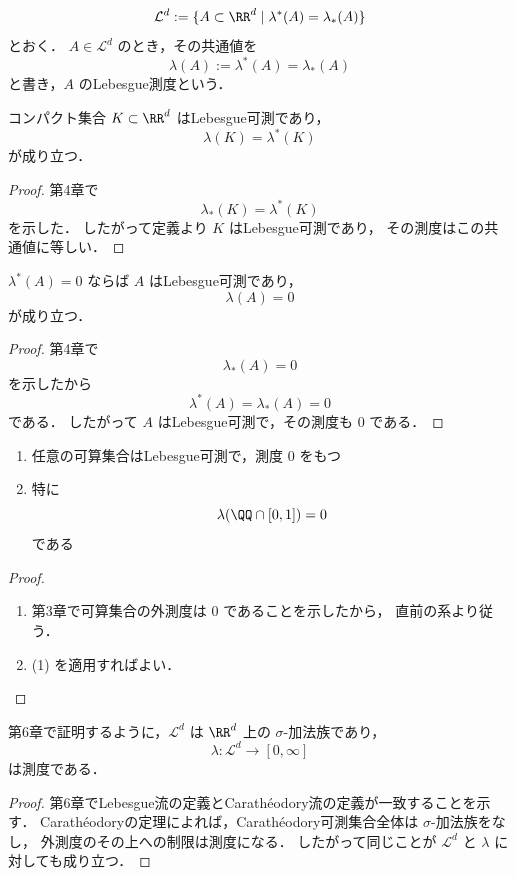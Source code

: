 \begin{definition}[Lebesgue可測集合とLebesgue測度]
\[
\mathcal L^d
:=
\{A \subset \RR^d \mid \lambda^*(A)=\lambda_*(A)\}
\]
とおく．
$A \in \mathcal L^d$ のとき，その共通値を
\[
\lambda(A)
:=
\lambda^*(A)=\lambda_*(A)
\]
と書き，$A$ のLebesgue測度という．
\end{definition}

\begin{proposition}[コンパクト集合はLebesgue可測]
コンパクト集合 $K \subset \RR^d$ はLebesgue可測であり，
\[
\lambda(K)=\lambda^*(K)
\]
が成り立つ．
\end{proposition}
\begin{proof}
第4章で
\[
\lambda_*(K)=\lambda^*(K)
\]
を示した．
したがって定義より $K$ はLebesgue可測であり，
その測度はこの共通値に等しい．
\end{proof}

\begin{corollary}[外測度零集合はLebesgue可測]
$\lambda^*(A)=0$ ならば $A$ はLebesgue可測であり，
\[
\lambda(A)=0
\]
が成り立つ．
\end{corollary}
\begin{proof}
第4章で
\[
\lambda_*(A)=0
\]
を示したから
\[
\lambda^*(A)=\lambda_*(A)=0
\]
である．
したがって $A$ はLebesgue可測で，その測度も $0$ である．
\end{proof}

\begin{example}
\begin{enumerate}
    \item 任意の可算集合はLebesgue可測で，測度 $0$ をもつ
    \item 特に
    \[
    \lambda(\QQ \cap [0,1])=0
    \]
    である
\end{enumerate}
\end{example}
\begin{proof}
\begin{enumerate}
    \item 第3章で可算集合の外測度は $0$ であることを示したから，
    直前の系より従う．
    \item (1) を適用すればよい．
\end{enumerate}
\end{proof}

\begin{theorem}[基本定理]
第6章で証明するように，$\mathcal L^d$ は $\RR^d$ 上の $\sigma$-加法族であり，
\[
\lambda:\mathcal L^d\to[0,\infty]
\]
は測度である．
\end{theorem}
\begin{proof}
第6章でLebesgue流の定義とCarathéodory流の定義が一致することを示す．
Carathéodoryの定理によれば，Carathéodory可測集合全体は $\sigma$-加法族をなし，
外測度のその上への制限は測度になる．
したがって同じことが $\mathcal L^d$ と $\lambda$ に対しても成り立つ．
\end{proof}

